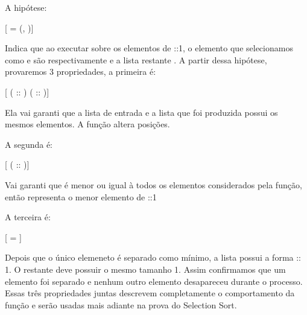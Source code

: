     A hipótese: 


    [   = (, )]


    Indica que ao executar  sobre os elementos de ::1, o elemento
    que selecionamos como  e  são respectivamente  e a lista restante .
    A partir dessa hipótese, provaremos 3 propriedades, a primeira é: 


    [  ( :: ) ( :: )]


    Ela vai garanti que a lista de entrada e a lista que foi produzida possui os mesmos elementos. A função altera posições.


    A segunda é:


    [  ( :: )]


    Vai garanti que  é menor ou igual à todos os elementos considerados pela função, então  representa o menor elemento de ::1


    A terceira é: 


    [  =  ]


    Depois que o único elemeneto é separado como mínimo, a lista possui a forma  :: 1. O restante  deve possuir o mesmo tamanho 1. Assim confirmamos que um elemento foi separado e nenhum outro elemento desapareceu durante o processo.
    Essas três propriedades juntas descrevem completamente o comportamento da função  e serão usadas mais adiante na prova do Selection Sort.


